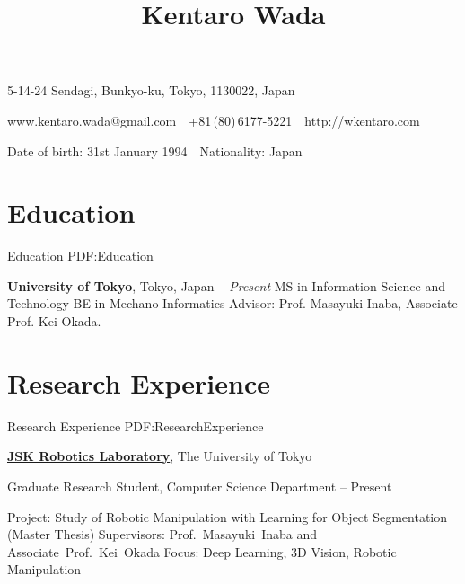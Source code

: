 \documentclass[letterpaper,MMMyyyy,nonstop]{simpleresumecv}
\newcommand{\CVAuthor}{Kentaro Wada}
\newcommand{\CVWebpage}{http://wkentaro.com}
\begin{document}

\title{\CVAuthor}

\begin{subtitle}
5-14-24 Sendagi, Bunkyo-ku, Tokyo, 1130022, Japan
\par
www.kentaro.wada@gmail.com
\,\SubBulletSymbol\,
+81\,(80)\,6177-5221
\,\SubBulletSymbol\,
\CVWebpage
\par
Date of birth: 31st January 1994
\,\SubBulletSymbol\,
Nationality: Japan

\noindent\makebox[\linewidth]{\rule{0.85\paperwidth}{0.4pt}}
\end{subtitle}

\begin{body}


\section
{Education}
{Education}
{PDF:Education}

\textbf{University of Tokyo}, Tokyo, Japan
\hfill
{\it {} -- Present}
\newline
MS in Information Science and Technology
\newline
BE in Mechano-Informatics
\newline
Advisor: Prof. Masayuki Inaba, Associate Prof. Kei Okada.


\section
{Research Experience}
{Research Experience}
{PDF:ResearchExperience}

\href{http://www.jsk.t.u-tokyo.ac.jp/}
{\textbf{JSK Robotics Laboratory}},
The University of Tokyo

\GapNoBreak
\BulletItem
Graduate Research Student, Computer Science Department
\hfill
{} --
Present
\begin{detail}
\SubBulletItem
Project:
Study of Robotic Manipulation with Learning for Object Segmentation (Master Thesis)
\SubBulletItem
Supervisors:
Prof.~Masayuki~Inaba and Associate~Prof.~Kei~Okada
\SubBulletItem
Focus:
Deep Learning, 3D Vision, Robotic Manipulation
\end{detail}


\end{body}
\end{document}
